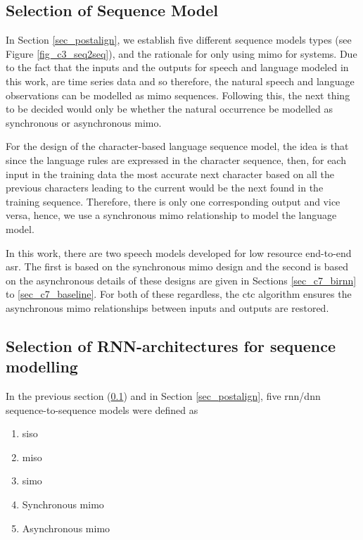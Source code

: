 \subsection{Selection of Sequence Model}\label{sec_c6_seqsel}
In Section \ref{sec_postalign}, we establish five different sequence models types (see Figure \ref{fig_c3_seq2seq}), and the rationale for only using \acrshort{mimo} for systems.  Due to the fact that the inputs and the outputs for speech and language   modeled in this work, are time series data and so therefore, the natural speech and language observations can be modelled as \acrshort{mimo} sequences.  Following this, the next thing to be decided would only be whether the natural occurrence be modelled as synchronous or asynchronous \acrshort{mimo}.

For the design of the character-based language sequence model, the idea is that since the language rules are expressed in the character sequence, then, for each input in the training data the most accurate next character based on all the previous characters leading to the current would be the next found in the training sequence.  Therefore, there is only one corresponding output and vice versa, hence, we use a synchronous \acrshort{mimo} relationship to model the language model.

In this work, there are two speech models developed for low resource end-to-end \acrshort{asr}.  The first is based on the synchronous \acrshort{mimo} design and the second is based on the asynchronous details of these designs are given in Sections \ref{sec_c7_birnn} to \ref{sec_c7_baseline}. For both of these regardless, the \acrshort{ctc} algorithm ensures the asynchronous \acrshort{mimo} relationships between inputs and outputs are restored.

\subsection{Selection of RNN-architectures for sequence modelling}
In the previous section (\ref{sec_c6_seqsel}) and in Section \ref{sec_postalign}, five \acrshort{rnn}/\acrshort{dnn} sequence-to-sequence models were defined as 
\begin{enumerate}
    \item \acrfull{siso}
    \item \acrfull{miso}
    \item \acrfull{simo}
    \item Synchronous \acrfull{mimo}
    \item Asynchronous \acrfull{mimo}
\end{enumerate}


